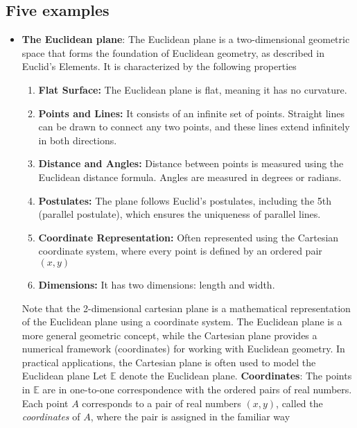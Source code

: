 \documentclass{report}
\begin{document}
    \subsection{Five examples}
    \begin{itemize}
        \item \textbf{The Euclidean plane}: The Euclidean plane is a two-dimensional geometric space that forms the foundation of Euclidean geometry, as described in Euclid's Elements. It is characterized by the following properties
            \begin{enumerate}
                \item \textbf{Flat Surface:} The Euclidean plane is flat, meaning it has no curvature.
                \item \textbf{Points and Lines:} It consists of an infinite set of points. Straight lines can be drawn to connect any two points, and these lines extend infinitely in both directions.
                \item \textbf{Distance and Angles:} Distance between points is measured using the Euclidean distance formula. Angles are measured in degrees or radians.
                \item \textbf{Postulates:} The plane follows Euclid’s postulates, including the 5th (parallel postulate), which ensures the uniqueness of parallel lines.
                \item \textbf{Coordinate Representation:} Often represented using the Cartesian coordinate system, where every point is defined by an ordered pair $(x,y)$
                \item \textbf{Dimensions:} It has two dimensions: length and width.
            \end{enumerate}
            Note that the 2-dimensional cartesian plane is a mathematical representation of the Euclidean plane using a coordinate system.
            The Euclidean plane is a more general geometric concept, while the Cartesian plane provides a numerical framework (coordinates) for working with Euclidean geometry. In practical applications, the Cartesian plane is often used to model the Euclidean plane
            \bigbreak \noindent 
            Let $\mathbb{E}$ denote the Euclidean plane. 
            \bigbreak \noindent 
            \textbf{Coordinates}: The points in $\mathbb{E}$ are in one-to-one correspondence with the ordered pairs of real numbers. Each point $A$ corresponds to a pair of real numbers $(x,y)$, called the \textit{coordinates} of $A$, where the pair is assigned in the familiar way

\end{itemize}
\end{document}
